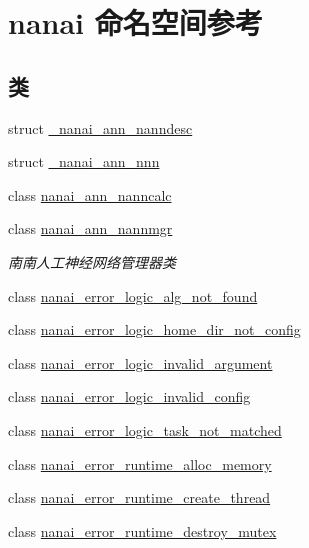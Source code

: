 \hypertarget{namespacenanai}{}\section{nanai 命名空间参考}
\label{namespacenanai}
\subsection*{类}
\begin{DoxyCompactItemize}
\item 
struct \hyperlink{structnanai_1_1__nanai__ann__nanndesc}{\+\_\+nanai\+\_\+ann\+\_\+nanndesc}
\item 
struct \hyperlink{structnanai_1_1__nanai__ann__nnn}{\+\_\+nanai\+\_\+ann\+\_\+nnn}
\item 
class \hyperlink{classnanai_1_1nanai__ann__nanncalc}{nanai\+\_\+ann\+\_\+nanncalc}
\item 
class \hyperlink{classnanai_1_1nanai__ann__nannmgr}{nanai\+\_\+ann\+\_\+nannmgr}
\begin{DoxyCompactList}\small\item\em 南南人工神经网络管理器类 \end{DoxyCompactList}\item 
class \hyperlink{classnanai_1_1nanai__error__logic__alg__not__found}{nanai\+\_\+error\+\_\+logic\+\_\+alg\+\_\+not\+\_\+found}
\item 
class \hyperlink{classnanai_1_1nanai__error__logic__home__dir__not__config}{nanai\+\_\+error\+\_\+logic\+\_\+home\+\_\+dir\+\_\+not\+\_\+config}
\item 
class \hyperlink{classnanai_1_1nanai__error__logic__invalid__argument}{nanai\+\_\+error\+\_\+logic\+\_\+invalid\+\_\+argument}
\item 
class \hyperlink{classnanai_1_1nanai__error__logic__invalid__config}{nanai\+\_\+error\+\_\+logic\+\_\+invalid\+\_\+config}
\item 
class \hyperlink{classnanai_1_1nanai__error__logic__task__not__matched}{nanai\+\_\+error\+\_\+logic\+\_\+task\+\_\+not\+\_\+matched}
\item 
class \hyperlink{classnanai_1_1nanai__error__runtime__alloc__memory}{nanai\+\_\+error\+\_\+runtime\+\_\+alloc\+\_\+memory}
\item 
class \hyperlink{classnanai_1_1nanai__error__runtime__create__thread}{nanai\+\_\+error\+\_\+runtime\+\_\+create\+\_\+thread}
\item 
class \hyperlink{classnanai_1_1nanai__error__runtime__destroy__mutex}{nanai\+\_\+error\+\_\+runtime\+\_\+destroy\+\_\+mutex}

\end{DoxyCompactItemize}
